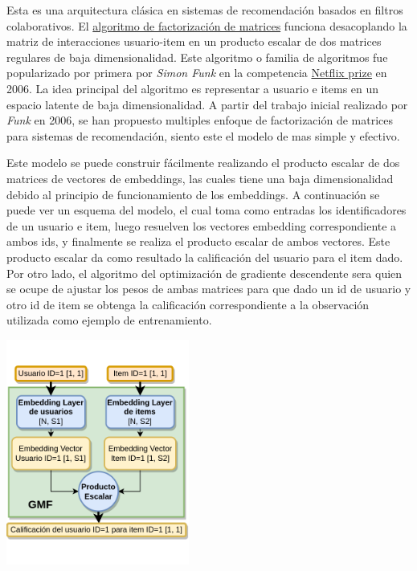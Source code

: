 \documentclass[11pt,a4paper,twoside]{thesis}
\begin{document}
Esta es una arquitectura clásica en sistemas de recomendación basados en filtros colaborativos. El \href{https://sifter.org/~simon/journal/20061211.html}{algoritmo de factorización de matrices} funciona desacoplando la matriz de interacciones usuario-item en un producto escalar de dos matrices regulares de baja dimensionalidad. Este algoritmo o familia de algoritmos fue popularizado por primera por \textit{Simon Funk} en la competencia \href{https://en.wikipedia.org/wiki/Netflix_Prize}{Netflix prize} en 2006. La idea principal del algoritmo es representar a usuario e items en un espacio latente de baja dimensionalidad.
A partir del trabajo inicial realizado por  \textit{Funk} en 2006, se han propuesto multiples enfoque de factorización de matrices para sistemas de recomendación, siento este el modelo de mas simple y efectivo.

Este modelo se puede construir fácilmente realizando el producto escalar de dos matrices de vectores de embeddings, las cuales tiene una baja dimensionalidad debido al principio de funcionamiento de los embeddings. A continuación se puede ver un esquema del modelo, el cual toma como entradas los identificadores de un usuario e item, luego resuelven los vectores embedding correspondiente a ambos ids, y finalmente se realiza el producto escalar de ambos vectores. Este producto escalar da como resultado la calificación del usuario para el item dado. Por otro lado, el algoritmo del optimización de gradiente descendente sera quien se ocupe de ajustar los pesos de ambas matrices para que dado un id de usuario y otro id de item se obtenga la calificación correspondiente a la observación utilizada como ejemplo de entrenamiento.

\begin{center}
	\includegraphics[width=6cm]{./images/GMF.png}
\end{center}
\end{document}
